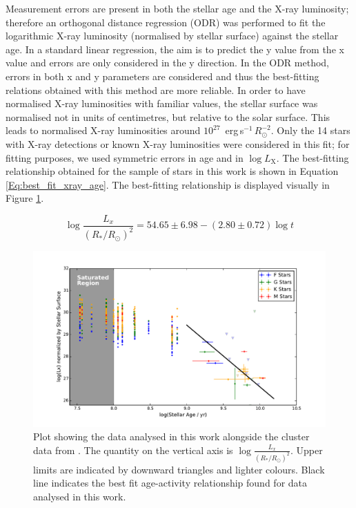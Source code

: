 Measurement errors are present in both the stellar age and the X-ray luminosity; therefore an orthogonal distance regression (ODR) \citep{Boggs_Rogers_1990} was performed to fit the logarithmic X-ray luminosity (normalised by stellar surface) against the stellar age. In a standard linear regression, the aim is to predict the y value from the x value and errors are only considered in the y direction. In the ODR method, errors in both x and y parameters are considered and thus the best-fitting relations obtained with this method are more reliable. In order to have normalised X-ray luminosities with familiar values, the stellar surface was normalised not in units of centimetres, but relative to the solar surface. This leads to normalised X-ray luminosities around $10^{27}$~erg\,s$^{-1}$\,$R_\odot^{-2}$. Only the 14 stars with X-ray detections or known X-ray luminosities were considered in this fit; for fitting purposes, we used symmetric errors in age and in $\log L_{\mathrm{X}}$. The best-fitting relationship obtained for the sample of stars in this work is shown in Equation \ref{Eq:best_fit_xray_age}. The best-fitting relationship is displayed visually in Figure \ref{fig:full_xray_plot_with_clusters}.

\begin{equation}
	\log\frac{L_{x}}{(R_\ast/R_\odot)^{2}} = 54.65 \pm 6.98 - (2.80 \pm 0.72)\log t
	\label{Eq:best_fit_xray_age}
\end{equation}

\begin{figure}[h]
    \centering
    \includegraphics[scale=0.55]{Figures/3-Xray_age/full_xray_results.pdf}
    \caption[Plot of X-ray sample with best-fitting relationship and cluster data for reference]{Plot showing the data analysed in this work alongside the cluster data from \citet{Jackson_etal_2012}. The quantity on the vertical axis is $\log\frac{L_{x}}{(R_\ast/R_\odot)^{2}}$. Upper limits are indicated by downward triangles and lighter colours.  Black line indicates the best fit age-activity relationship found for data analysed in this work.}
    \label{fig:full_xray_plot_with_clusters}
\end{figure}

